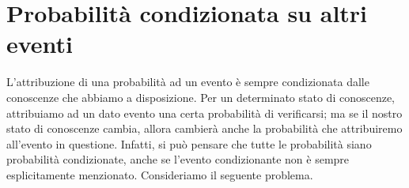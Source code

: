 \documentclass[
  11pt,
]{krantz}
\theoremstyle{definition}
\theoremstyle{definition}
\theoremstyle{definition}
\theoremstyle{definition}
\theoremstyle{remark}
\begin{document}
\hypertarget{sec:bayes-cancer}{%
\section{Probabilità condizionata su altri eventi}\label{sec:bayes-cancer}}

L'attribuzione di una probabilità ad un evento è sempre condizionata dalle conoscenze che abbiamo a disposizione. Per un determinato stato di conoscenze, attribuiamo ad un dato evento una certa probabilità di verificarsi; ma se il nostro stato di conoscenze cambia, allora cambierà anche la probabilità che attribuiremo all'evento in questione. Infatti, si può pensare che tutte le probabilità siano probabilità condizionate, anche se l'evento condizionante non è sempre esplicitamente menzionato. Consideriamo il seguente problema.
\end{document}
